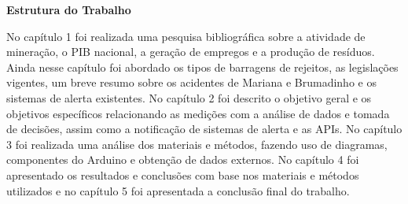 \vspace{0.5cm}
\textbf{Estrutura do Trabalho}
\vspace{0.5cm}

No capítulo 1 foi realizada uma pesquisa bibliográfica sobre a atividade de mineração, o PIB nacional, a geração de empregos e a produção de resíduos. Ainda nesse capítulo foi abordado os tipos de barragens de rejeitos, as legislações vigentes, um breve resumo sobre os acidentes de Mariana e Brumadinho e os sistemas de alerta existentes. No capítulo 2 foi descrito o objetivo geral e os objetivos específicos relacionando as medições com a análise de dados e tomada de decisões, assim como a notificação de sistemas de alerta e as APIs. No capítulo 3 foi realizada uma análise dos materiais e métodos, fazendo uso de diagramas, componentes do Arduino e obtenção de dados externos. No capítulo 4 foi apresentado os resultados e conclusões com base nos materiais e métodos utilizados e no capítulo 5 foi apresentada a conclusão final do trabalho.

\vspace{10mm} %

